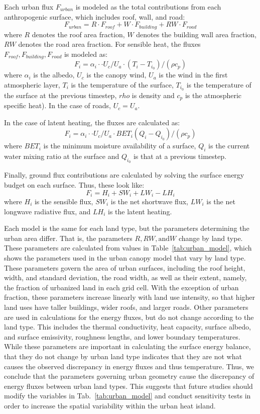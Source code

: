 \documentclass[draft,linenumbers]{agujournal}
\begin{document}
Each urban flux $F_{urban}$ is modeled as the total contributions from each anthropogenic surface, which includes roof, wall, and road: 
\[ F_{urban} = R\cdot F_{roof} + W\cdot F_{building} + RW\cdot F_{road} \]
where $R$ denotes the roof area fraction, $W$ denotes the building wall area fraction, $RW$ denotes the road area fraction. For sensible heat, the fluxes $F_{roof}, F_{building}, F_{road}$ is modeled as: 
\[F_i = \alpha_i\cdot \cdot U_c/U_a \cdot \left( T_i - T_{i_0}\right) / \left( \rho c_p \right ) \] 
where $\alpha_i $ is the albedo, $U_c$ is the canopy wind, $U_a$ is the wind in the first atmospheric layer, $T_i$ is the temperature of the surface, $T_{i_0}$ is the temperature of the surface at the previous timestep, $rho$ is density and $c_p$ is the atmospheric specific heat). In the case of roads, $U_c = U_a$.

In the case of latent heating, the fluxes are calculated as: 
\[F_i = \alpha_i\cdot \cdot U_c/U_a \cdot BET_i \left( Q_i - Q_{i_0}\right) / \left( \rho c_p \right ) \] 
where $BET_i$ is the minimum moisture availability of a surface, $Q_i$ is the current water mixing ratio at the surface and $Q_{i_0}$ is that at a previous timestep.

Finally, ground flux contributions are calculated by solving the surface energy budget on each surface. Thus, these look like: 
\[ F_i = H_i +SW_i + LW_i - LH_i\]
where $H_i$ is the sensible flux, $SW_i$ is the net shortwave flux, $LW_i$ is the net longwave radiative flux, and $LH_i$ is the latent heating. 

Each model is the same for each land type, but the parameters determining the urban area differ. That is, the parameters $R, RW, \text{and} W$ change by land type. These parameters are calculated from values in Table~\ref{tab:urban_model}, which shows the parameters used in the urban canopy model that vary by land type. These parameters govern the area of urban surfaces, including the roof height, width, and standard deviation, the road width, as well as their extent, namely, the fraction of urbanized land in each grid cell. 
With the exception of urban fraction, these parameters increase linearly with land use intensity, so that higher land uses have taller buildings, wider roofs, and larger roads. 
Other parameters are used in calculations for the energy fluxes, but do not change according to the land type. This includes the thermal conductivity, heat capacity, surface albedo, and surface emissivity, roughness lengths, and lower boundary temperatures. While these parameters are important in calculating the surface energy balance, that they do not change by urban land type indicates that they are not what causes the observed discrepancy in energy fluxes and thus temperature. 
Thus, we conclude that the parameters governing urban geometry cause the discrepancy of energy fluxes between urban land types. 
This suggests that future studies should modify the variables in Tab.~\ref{tab:urban_model} and conduct sensitivity tests in order to increase the spatial variability within the urban heat island.
\end{document}
